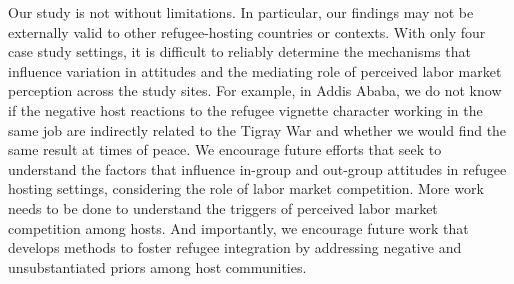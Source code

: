 \documentclass[a4paper,12pt]{article}
\renewcommand{\figurename}{Figure}
\begin{document}
Our study is not without limitations. In particular, our findings may not be externally valid to other refugee-hosting countries or contexts. With only four case study settings, it is difficult to reliably determine the mechanisms that influence variation in attitudes and the mediating role of perceived labor market perception across the study sites. For example, in Addis Ababa, we do not know if the negative host reactions to the refugee vignette character working in the same job are indirectly related to the Tigray War and whether we would find the same result at times of peace. We encourage future efforts that seek to understand the factors that influence in-group and out-group attitudes in refugee hosting settings, considering the role of labor market competition. More work needs to be done to understand the triggers of perceived labor market competition among hosts. And importantly, we encourage future work that develops methods to foster refugee integration by addressing negative and unsubstantiated priors among host communities. 
\pagebreak

\singlespacing

%
%
%
%

%
\clearpage


\makeatletter
\renewcommand{\thefigure}{A\@arabic\c@figure}
\renewcommand{\theequation}{A\@arabic\c@equation}
\renewcommand{\thetable}{A\@arabic\c@table}
\renewcommand{\thesection}{A\arabic{section}}
\makeatletter
\renewcommand{\figurename}{Figure}
\renewcommand{\tablename}{Table}
\renewcommand{\baselinestretch}{1}
\setcounter{section}{0}
\setcounter{figure}{0}
\setcounter{equation}{0}
\setcounter{table}{0}


	
\end{document}

